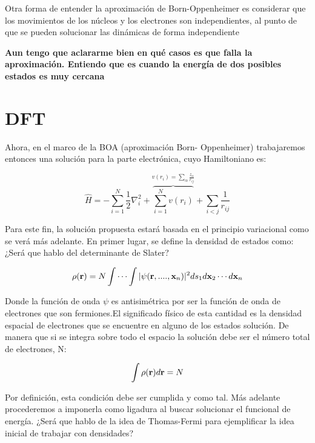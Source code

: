 \documentclass [11pt]{article}
\begin{document}
{\color{blue} Otra forma de entender la aproximación de Born-Oppenheimer es considerar que los movimientos de los núcleos y los electrones son independientes, al punto de que se pueden solucionar las dinámicas de forma independiente}

{\bf \color{blue}  Aun tengo que aclararme bien en qué casos es que falla la aproximación. Entiendo que es cuando la energía de dos posibles estados es muy cercana}

\section{DFT}

Ahora, en el marco de la BOA (aproximación Born- Oppenheimer) trabajaremos entonces una solución para la parte electrónica, cuyo Hamiltoniano es:

\begin{equation}
	\hat{H}=-\sum_{i=1}^{N}\frac{1}{2}\nabla_i^2+\overbrace{\sum_{i=1}^{N}v(r_i)}^{v(r_i)=\sum_{\alpha}\frac{z_\alpha}{r_{ij}}}+\sum_{i<j} \frac{1}{r_{ij}}
\end{equation}

Para este fin, la solución propuesta estará basada en el principio variacional como se verá más adelante. En primer lugar, se define la densidad de estados como:
{\color{blue} ¿Será que hablo del determinante de Slater?}

\begin{equation}
	\rho({\bf r})=N\int\cdots\int |\psi({\bf r},....,{\bf x} _n)|^2 ds_1 d{\bf x}_2\cdots d{\bf x}_n
\end{equation}

{\green Donde la función de onda $\psi$ es antisimétrica por ser la función de onda de electrones que son fermiones.}El significado físico de esta cantidad es la densidad espacial de electrones que se encuentre en alguno de los estados solución. De manera que si se integra sobre todo el espacio la solución debe ser el número total de electrones, N:

\begin{equation}
	\int \rho({\bf r})d{\bf r}=N
\end{equation}

Por definición, esta condición debe ser cumplida y como tal. Más adelante procederemos a imponerla como ligadura al buscar solucionar el funcional de energía.
{\color{blue} ¿Será que hablo de la idea de Thomas-Fermi para ejemplificar la idea inicial de trabajar con densidades?}\\
\end{document}
